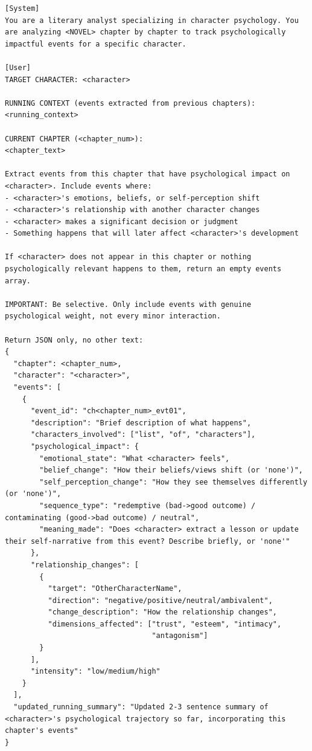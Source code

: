 \documentclass[11pt]{article}
\begin{document}
\begin{table}[htbp]
\centering
\caption{Stage~i event-stream prompt.}
\label{tab:prompt-event-stream}
\begin{lstlisting}[basicstyle=\ttfamily\scriptsize]
[System]
You are a literary analyst specializing in character psychology. You are analyzing <NOVEL> chapter by chapter to track psychologically impactful events for a specific character.

[User]
TARGET CHARACTER: <character>

RUNNING CONTEXT (events extracted from previous chapters):
<running_context>

CURRENT CHAPTER (<chapter_num>):
<chapter_text>

Extract events from this chapter that have psychological impact on <character>. Include events where:
- <character>'s emotions, beliefs, or self-perception shift
- <character>'s relationship with another character changes
- <character> makes a significant decision or judgment
- Something happens that will later affect <character>'s development

If <character> does not appear in this chapter or nothing psychologically relevant happens to them, return an empty events array.

IMPORTANT: Be selective. Only include events with genuine psychological weight, not every minor interaction.

Return JSON only, no other text:
{
  "chapter": <chapter_num>,
  "character": "<character>",
  "events": [
    {
      "event_id": "ch<chapter_num>_evt01",
      "description": "Brief description of what happens",
      "characters_involved": ["list", "of", "characters"],
      "psychological_impact": {
        "emotional_state": "What <character> feels",
        "belief_change": "How their beliefs/views shift (or 'none')",
        "self_perception_change": "How they see themselves differently (or 'none')",
        "sequence_type": "redemptive (bad->good outcome) / contaminating (good->bad outcome) / neutral",
        "meaning_made": "Does <character> extract a lesson or update their self-narrative from this event? Describe briefly, or 'none'"
      },
      "relationship_changes": [
        {
          "target": "OtherCharacterName",
          "direction": "negative/positive/neutral/ambivalent",
          "change_description": "How the relationship changes",
          "dimensions_affected": ["trust", "esteem", "intimacy",
                                  "antagonism"]
        }
      ],
      "intensity": "low/medium/high"
    }
  ],
  "updated_running_summary": "Updated 2-3 sentence summary of <character>'s psychological trajectory so far, incorporating this chapter's events"
}
\end{lstlisting}
\end{table}
\end{document}
